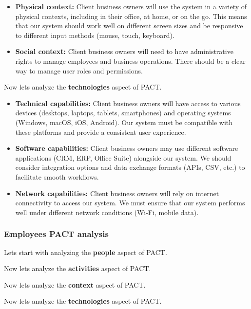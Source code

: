 \documentclass[]{VUMIFTemplateClass}
\begin{document}
\begin{itemize}
    \item \textbf{Physical context:} Client business owners will use the system
    in a variety of physical contexts, including in their office, at home, or
    on the go. This means that our system should work well on different screen
    sizes and be responsive to different input methods (mouse, touch, keyboard).
    \item \textbf{Social context:} Client business owners will need to have administrative
    rights to manage employees and business operations. There should be a clear
    way to manage user roles and permissions.
\end{itemize}

Now lets analyze the \textbf{technologies} aspect of PACT.

\begin{itemize}
    \item \textbf{Technical capabilities:} Client business owners will have
    access to various devices (desktops, laptops, tablets, smartphones) and
    operating systems (Windows, macOS, iOS, Android). Our system must be
    compatible with these platforms and provide a consistent user experience.
    \item \textbf{Software capabilities:} Client business owners may use
    different software applications (CRM, ERP, Office Suite) alongside our
    system. We should consider integration options and data exchange formats
    (APIs, CSV, etc.) to facilitate smooth workflows.
    \item \textbf{Network capabilities:} Client business owners will rely on
    internet connectivity to access our system. We must ensure that our system
    performs well under different network conditions (Wi-Fi, mobile data).
\end{itemize}

\subsubsection{Employees PACT analysis}

Lets start with analyzing the \textbf{people} aspect of PACT. 

Now lets analyze the \textbf{activities} aspect of PACT.

Now lets analyze the \textbf{context} aspect of PACT.

Now lets analyze the \textbf{technologies} aspect of PACT.
\end{document}
